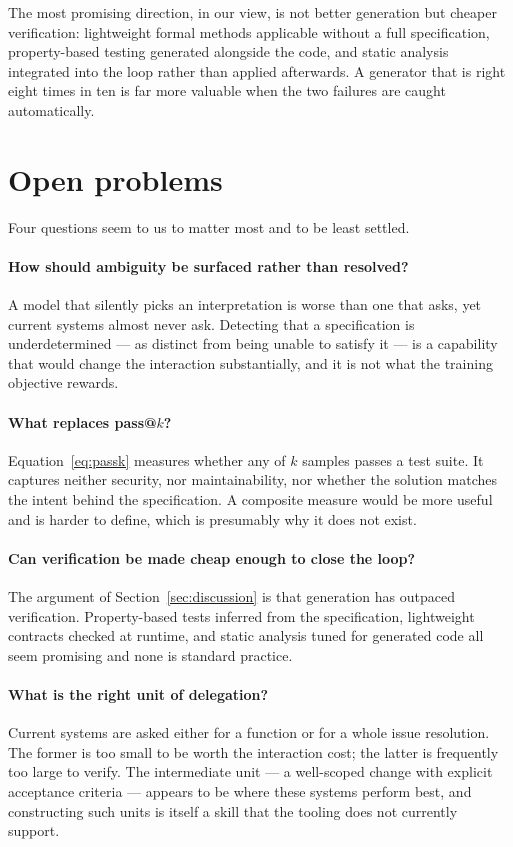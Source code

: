 \documentclass[11pt,a4paper]{article}
\begin{document}
The most promising direction, in our view, is not better generation but
cheaper verification: lightweight formal methods applicable without a full
specification, property-based testing generated alongside the code, and static
analysis integrated into the loop rather than applied afterwards. A generator
that is right eight times in ten is far more valuable when the two failures
are caught automatically.

\section{Open problems}
\label{sec:open}

Four questions seem to us to matter most and to be least settled.

\paragraph{How should ambiguity be surfaced rather than resolved?}
A model that silently picks an interpretation is worse than one that asks,
yet current systems almost never ask. Detecting that a specification is
underdetermined --- as distinct from being unable to satisfy it --- is a
capability that would change the interaction substantially, and it is not
what the training objective rewards.

\paragraph{What replaces pass@$k$?}
Equation~\ref{eq:passk} measures whether any of $k$ samples passes a test
suite. It captures neither security, nor maintainability, nor whether the
solution matches the intent behind the specification. A composite measure
would be more useful and is harder to define, which is presumably why it does
not exist.

\paragraph{Can verification be made cheap enough to close the loop?}
The argument of Section~\ref{sec:discussion} is that generation has outpaced
verification. Property-based tests inferred from the specification, lightweight
contracts checked at runtime, and static analysis tuned for generated code all
seem promising and none is standard practice.

\paragraph{What is the right unit of delegation?}
Current systems are asked either for a function or for a whole issue
resolution. The former is too small to be worth the interaction cost; the
latter is frequently too large to verify. The intermediate unit --- a
well-scoped change with explicit acceptance criteria --- appears to be where
these systems perform best, and constructing such units is itself a skill that
the tooling does not currently support.
\end{document}
